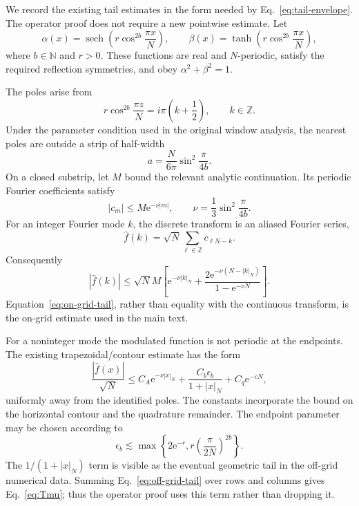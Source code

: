 \documentclass[aps,floatfix,10pt,amssymb,amsmath,superscriptaddress,nofootinbib,longbibliography,nobalancelastpage,twocolumn]{revtex4-2}
\newcommand{\e}{\mathrm{e}}
\begin{document}
We record the existing tail estimates in the form needed by Eq.~\eqref{eq:tail-envelope}.  The operator proof does not require a new pointwise estimate.  Let
\begin{equation}
 \alpha(x)=\operatorname{sech}\!\left(r\cos^{2b}\frac{\pi x}{N}\right),
 \qquad
 \beta(x)=\tanh\!\left(r\cos^{2b}\frac{\pi x}{N}\right),
 \label{eq:windows}
\end{equation}
where $b\in\mathbb N$ and $r>0$.  These functions are real and $N$-periodic, satisfy the required reflection symmetries, and obey $\alpha^2+\beta^2=1$.

The poles arise from
\begin{equation}
 r\cos^{2b}\frac{\pi z}{N}=i\pi\left(k+\frac12\right),
 \qquad k\in\mathbb Z.
 \label{eq:poles}
\end{equation}
Under the parameter condition used in the original window analysis, the nearest poles are outside a strip of half-width
\begin{equation}
 a=\frac{N}{6\pi}\sin^2\frac{\pi}{4b}.
 \label{eq:strip}
\end{equation}
On a closed substrip, let $M$ bound the relevant analytic continuation.  Its periodic Fourier coefficients satisfy
\begin{equation}
 |c_m|\leq M\e^{-\nu|m|},
 \qquad \nu=\frac13\sin^2\frac{\pi}{4b}.
 \label{eq:fourier-coeff}
\end{equation}
For an integer Fourier mode $k$, the discrete transform is an aliased Fourier series,
\begin{equation}
 \widehat f(k)=\sqrt N\sum_{\ell\in\mathbb Z}c_{\ell N-k}.
 \label{eq:alias}
\end{equation}
Consequently
\begin{equation}
 |\widehat f(k)|\leq\sqrt N M\left[
 \e^{-\nu|k|_N}+
 \frac{2\e^{-\nu(N-|k|_N)}}{1-\e^{-\nu N}}
 \right].
 \label{eq:on-grid-tail}
\end{equation}
Equation~\eqref{eq:on-grid-tail}, rather than equality with the continuous transform, is the on-grid estimate used in the main text.

For a noninteger mode the modulated function is not periodic at the endpoints.  The existing trapezoidal/contour estimate has the form
\begin{equation}
 \frac{|\widehat f(x)|}{\sqrt N}\leq
 C_A\e^{-\nu|x|_N}
 +\frac{C_b\epsilon_b}{1+|x|_N}
 +C_q\e^{-cN},
 \label{eq:off-grid-tail}
\end{equation}
uniformly away from the identified poles.  The constants incorporate the bound on the horizontal contour and the quadrature remainder.  The endpoint parameter may be chosen according to
\begin{equation}
 \epsilon_b\lesssim
 \max\left\{2\e^{-r},
 r\left(\frac{\pi}{2N}\right)^{2b}\right\}.
 \label{eq:endpoint}
\end{equation}
The $1/(1+|x|_N)$ term is visible as the eventual geometric tail in the off-grid numerical data.  Summing Eq.~\eqref{eq:off-grid-tail} over rows and columns gives Eq.~\eqref{eq:Tmu}; thus the operator proof uses this term rather than dropping it.
\end{document}
